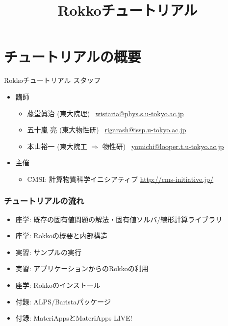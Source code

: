 \title{Rokkoチュートリアル}




\begin{frame}
  \titlepage
\end{frame}


\section{チュートリアルの概要}

\begin{frame}{Rokkoチュートリアル スタッフ}
  \begin{itemize}
  \item 講師
    \setlength{\itemsep}{1em}
    \begin{itemize}
      \setlength{\itemsep}{1em}
    \item 藤堂眞治 (東大院理) \ \href{mailto:wistaria@phys.s.u-tokyo.ac.jp}{wistaria@phys.s.u-tokyo.ac.jp}
    \item 五十嵐 亮 (東大物性研) \ \href{mailto:rigarash@issp.u-tokyo.ac.jp}{rigarash@issp.u-tokyo.ac.jp}
    \item 本山裕一 (東大院工 $\Rightarrow $ 物性研) \ \href{mailto:yomichi@looper.u-tokyo.ac.jp}{yomichi@looper.t.u-tokyo.ac.jp}
    \end{itemize}
  \item 主催
    \begin{itemize}
    \item CMSI: 計算物質科学イニシアティブ \url{http://cms-initiative.jp/}
    \end{itemize}
  \end{itemize}
\end{frame}

\begin{frame}
  \frametitle{チュートリアルの流れ}
  \begin{itemize}
  \item 座学: 既存の固有値問題の解法・固有値ソルバ/線形計算ライブラリ
  \item 座学: Rokkoの概要と内部構造
  \item 実習: サンプルの実行
  \item 実習: アプリケーションからのRokkoの利用
  \item 座学: Rokkoのインストール
  \item 付録: ALPS/Baristaパッケージ
  \item 付録: MateriAppsとMateriApps LIVE!
  \end{itemize}
\end{frame}

